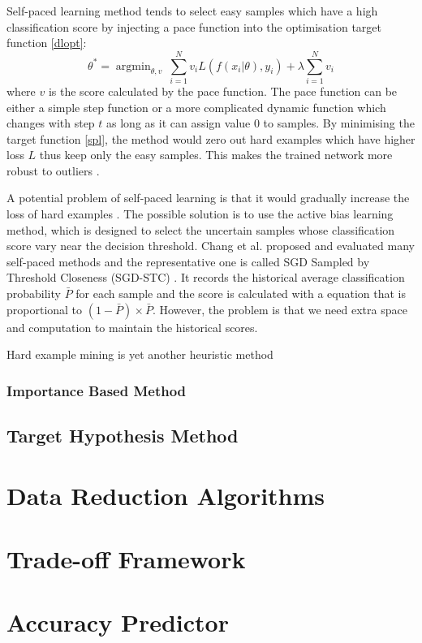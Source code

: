 Self-paced learning method tends to select easy samples which have a high classification score by injecting a pace function into the optimisation target function \ref{dlopt}:
\begin{equation}
\label{spl}
\theta^* = \mathop{\arg\min}_{\theta, v}\ \sum^{N}_{i=1} v_iL(f(x_i|\theta), y_i) + \lambda \sum^{N}_{i=1}  v_i
\end{equation}
where $v$ is the score calculated by the pace function. The pace function can be either a simple step function \cite{Kumar2010} or a more complicated dynamic function which changes with step $t$ \cite{Li2017} as long as it can assign value 0 to samples. By minimising the target function \ref{spl}, the method would zero out hard examples which have higher loss $L$ thus keep only the easy samples. This makes the trained network more robust to outliers \cite{Meng2016}. 

A potential problem of self-paced learning is that it would gradually increase the loss of hard examples \cite{Chang2017}. The possible solution is to use the active bias learning method, which is designed to select the uncertain samples whose classification score vary near the decision threshold. Chang et al. proposed and evaluated many self-paced methods and the representative one is called SGD Sampled by Threshold Closeness (SGD-STC) \cite{Chang2017}. It records the historical average classification probability $\bar{P}$ for each sample and the score is calculated with a equation that is proportional to $(1-\bar{P}) \times \bar{P}$. However, the problem is that we need extra space and computation to maintain the historical scores.

Hard example mining is yet another heuristic method 

\subsubsection{Importance Based Method}


\subsection{Target Hypothesis Method}


\section{Data Reduction Algorithms}

\section{Trade-off Framework}

\section{Accuracy Predictor}